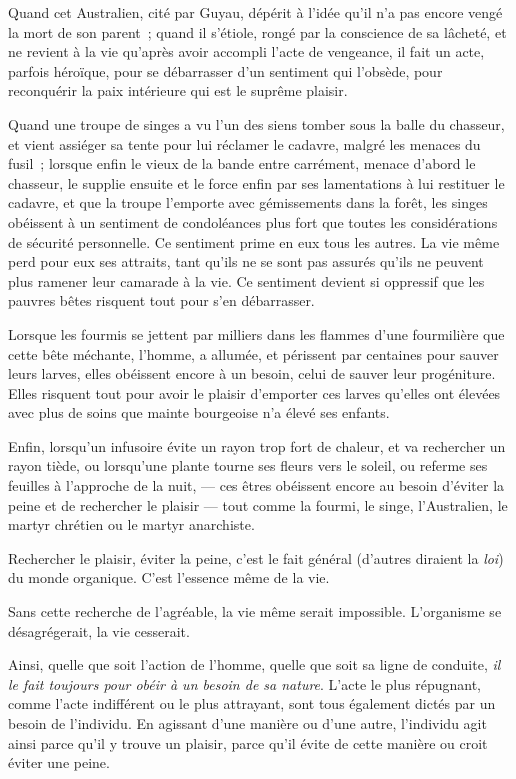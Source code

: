 \documentclass[french,twoside]{book} %
\begin{document}
Quand cet Australien, cité par Guyau, dépérit à l’idée qu’il n’a pas encore vengé la mort de son parent ; quand il s’étiole, rongé par la  conscience de sa lâcheté, et ne revient à la vie qu’après avoir accompli l’acte de vengeance, il fait un acte, parfois héroïque, pour se débarrasser d’un sentiment qui l’obsède, pour reconquérir la paix intérieure qui est le suprême plaisir.\par
Quand une troupe de singes a vu l’un des siens tomber sous la balle du chasseur, et vient assiéger sa tente pour lui réclamer le cadavre, malgré les menaces du fusil ; lorsque enfin le vieux de la bande entre carrément, menace d’abord le chasseur, le supplie ensuite et le force enfin par ses lamentations à lui restituer le cadavre, et que la troupe l’emporte avec gémissements dans la forêt, les singes obéissent à un sentiment de condoléances plus fort que toutes les considérations de sécurité personnelle. Ce sentiment prime en eux tous les autres. La vie même perd pour eux ses attraits, tant qu’ils ne se sont pas assurés qu’ils ne peuvent plus ramener leur camarade à la vie. Ce sentiment devient si oppressif que les pauvres bêtes risquent tout pour s’en débarrasser.\par
Lorsque les fourmis se jettent par milliers dans les flammes d’une fourmilière que cette bête méchante, l’homme, a allumée, et périssent par centaines pour sauver leurs larves, elles obéissent encore à un besoin, celui de sauver leur progéniture. Elles risquent tout pour avoir le plaisir d’emporter ces larves qu’elles ont élevées avec plus de soins que mainte bourgeoise n’a élevé ses enfants.\par
Enfin, lorsqu’un infusoire évite un rayon trop fort de chaleur, et va rechercher un rayon tiède, ou lorsqu’une plante tourne ses fleurs vers le soleil, ou referme ses feuilles à l’approche de la nuit, — ces êtres obéissent encore au besoin d’éviter la peine et de rechercher le plaisir — tout comme la fourmi, le singe, l’Australien, le martyr chrétien ou le martyr anarchiste.\par
\bigbreak
\noindent Rechercher le plaisir, éviter la peine, c’est le fait général (d’autres diraient la \emph{loi}) du monde organique. C’est l’essence même de la vie.\par
Sans cette recherche de l’agréable, la vie même serait impossible. L’organisme se désagrégerait, la vie cesserait.\par
\bigbreak
\noindent Ainsi, quelle que soit l’action de l’homme, quelle que soit sa ligne de conduite, \emph{il le fait toujours pour obéir à un besoin de sa nature}. L’acte le plus répugnant, comme l’acte indifférent ou le plus attrayant, sont tous également dictés par un besoin de l’individu. En agissant d’une manière ou d’une autre, l’individu agit ainsi parce qu’il y trouve un plaisir, parce qu’il évite de cette manière ou croit éviter une peine.\par
\end{document}
